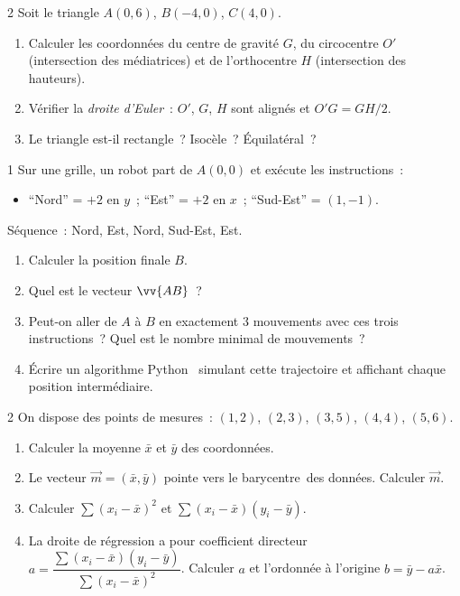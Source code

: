 \begin{probleme}{2}
Soit le triangle $A(0,6)$, $B(-4,0)$, $C(4,0)$.
\begin{enumerate}
  \item Calculer les coordonn\'ees du centre de gravité $G$,
        du circocentre $O'$ (intersection des m\'ediatrices)
        et de l'orthocentre $H$ (intersection des hauteurs).
  \item V\'erifier la \emph{droite d'Euler}~: $O'$, $G$, $H$ sont align\'es
        et $O'G = G H/2$.
  \item Le triangle est-il rectangle~? Isoc\`ele~? \'Equilat\'eral~?
\end{enumerate}
\end{probleme}

\begin{probleme}{1}
Sur une grille, un robot part de $A(0,0)$ et ex\'ecute les instructions~:
\begin{itemize}
  \item ``Nord'' = $+2$ en $y$~;
        ``Est'' = $+2$ en $x$~;
        ``Sud-Est'' = $(1,-1)$.
\end{itemize}
S\'equence~: Nord, Est, Nord, Sud-Est, Est.
\begin{enumerate}
  \item Calculer la position finale $B$.
  \item Quel est le vecteur $\vv{AB}$~?
  \item Peut-on aller de $A$ \`a $B$ en exactement $3$ mouvements avec ces trois instructions~?
        Quel est le nombre minimal de mouvements~?
  \item \'Ecrire un algorithme Python \computer\ simulant cette trajectoire
        et affichant chaque position interm\'ediaire.
\end{enumerate}
\end{probleme}

\begin{probleme}{2}
On dispose des points de mesures~:
$(1,2)$, $(2,3)$, $(3,5)$, $(4,4)$, $(5,6)$.
\begin{enumerate}
  \item Calculer la moyenne $\bar{x}$ et $\bar{y}$ des coordonn\'ees.
  \item Le vecteur $\vec{m}=(\bar{x},\bar{y})$ pointe vers le \og barycentre\fg\
        des donn\'ees. Calculer $\vec{m}$.
  \item Calculer $\sum(x_i-\bar{x})^2$ et $\sum(x_i-\bar{x})(y_i-\bar{y})$.
  \item La droite de r\'egression a pour coefficient directeur
        $a = \dfrac{\sum(x_i-\bar{x})(y_i-\bar{y})}{\sum(x_i-\bar{x})^2}$.
        Calculer $a$ et l'ordonn\'ee \`a l'origine $b=\bar{y}-a\bar{x}$.
\end{enumerate}
\end{probleme}

